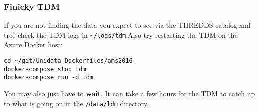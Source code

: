 \documentclass[11pt]{article}
\begin{document}
\subsubsection{\label{orgtarget6} Finicky TDM}
\label{sec:orgheadline47}

If you are not finding the data you expect to see via the THREDDS catalog.xml tree check the TDM logs in \texttt{\textasciitilde{}/logs/tdm}.Also try restarting the TDM on the Azure Docker host:

\begin{verbatim}
cd ~/git/Unidata-Dockerfiles/ams2016
docker-compose stop tdm
docker-compose run -d tdm
\end{verbatim}

You may also just have to \textbf{wait}. It can take a few hours for the TDM to catch up to what is going on in the \texttt{/data/ldm} directory.
\end{document}
